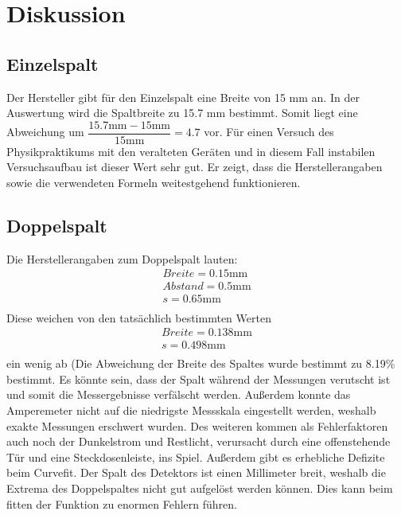 \section{Diskussion}
\label{sec:Diskussion}

\subsection{Einzelspalt}
    Der Hersteller gibt für den Einzelspalt eine Breite von 15 mm an. In der Auswertung wird
    die Spaltbreite zu 15.7 mm bestimmt. Somit liegt eine Abweichung um $\dfrac{15.7 \si{\milli\metre} 
    - 15 \si{\milli\metre}}{15 \si{\milli\metre}} = 4.7 $ vor. Für einen Versuch des Physikpraktikums mit den veralteten Geräten 
    und in diesem Fall instabilen Versuchsaufbau ist dieser Wert sehr gut. Er zeigt, dass die 
    Herstellerangaben sowie die verwendeten Formeln weitestgehend funktionieren.
    
\subsection{Doppelspalt}
    Die Herstellerangaben zum Doppelspalt lauten:
    \begin{align*}
        Breite = 0.15 \si{\milli\metre}\\
        Abstand = 0.5 \si{\milli\metre}\\
        s = 0.65 \si{\milli\metre}\\
    \end{align*}
    Diese weichen von den tatsächlich bestimmten Werten 
    \begin{align*}
        Breite = 0.138 \si{\milli\metre}\\
        s = 0.498 \si{\milli\metre}\\
    \end{align*}
    ein wenig ab (Die Abweichung der Breite des Spaltes wurde bestimmt zu 8.19\% bestimmt.
    Es könnte sein, dass 
    der Spalt während der Messungen verutscht ist und somit die Messergebnisse verfälscht werden.
    Außerdem konnte das Amperemeter nicht auf die niedrigste Messskala eingestellt werden, weshalb
    exakte Messungen erschwert wurden. Des weiteren kommen als Fehlerfaktoren auch noch der 
    Dunkelstrom und Restlicht, verursacht durch eine offenstehende Tür und eine Steckdosenleiste, 
    ins Spiel.
    Außerdem gibt es erhebliche Defizite beim Curvefit. Der Spalt des Detektors ist einen Millimeter 
    breit, weshalb die Extrema des Doppelspaltes nicht gut aufgelöst werden können. Dies kann beim 
    fitten der Funktion zu enormen Fehlern führen.

